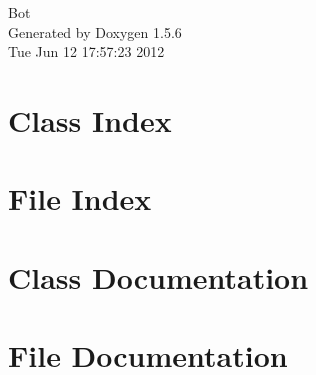 \documentclass[a4paper]{book}
\begin{document}
\begin{titlepage}
\vspace*{7cm}
\begin{center}
{\Large Bot }\\
\vspace*{1cm}
{\large Generated by Doxygen 1.5.6}\\
\vspace*{0.5cm}
{\small Tue Jun 12 17:57:23 2012}\\
\end{center}
\end{titlepage}
\clearemptydoublepage
{}
\tableofcontents
\clearemptydoublepage
{}
\chapter{Class Index}

\chapter{File Index}

\chapter{Class Documentation}


















\chapter{File Documentation}











\printindex
\end{document}
